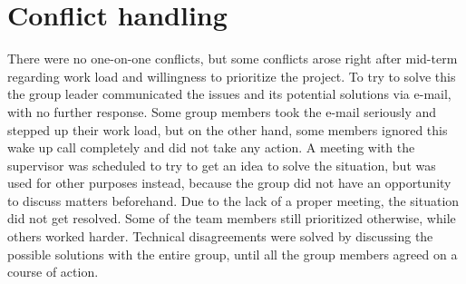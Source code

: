 \section{Conflict handling}
There were no one-on-one conflicts, but some conflicts arose right after mid-term regarding work load and willingness to prioritize the project. To try to solve this the group leader communicated the issues and its potential solutions via e-mail, with no further response. Some group members took the e-mail seriously and stepped up their work load, but on the other hand, some members ignored this wake up call completely and did not take any action. A meeting with the supervisor was scheduled to try to get an idea to solve the situation, but was used for other purposes instead, because the group did not have an opportunity to discuss matters beforehand. Due to the lack of a proper meeting, the situation did not get resolved. Some of the team members still prioritized otherwise, while others worked harder.
Technical disagreements were solved by discussing the possible solutions with the entire group, until all the group members agreed on a course of action.

